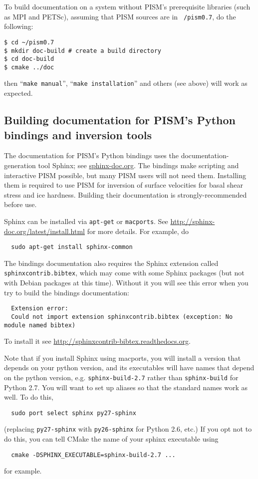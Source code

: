 \documentclass[titlepage,letterpaper,final]{scrartcl}
\begin{document}
To build documentation on a system without PISM's prerequisite
libraries (such as MPI and PETSc), assuming that PISM sources are in \texttt{~/pism0.7}, do the following:
\begin{verbatim}
$ cd ~/pism0.7
$ mkdir doc-build # create a build directory
$ cd doc-build
$ cmake ../doc
\end{verbatim}
then ``\texttt{make manual}'', ``\texttt{make installation}'' and
others (see above) will work as expected.

\subsection{Building documentation for PISM's Python bindings and inversion tools}
The documentation for PISM's Python bindings uses the documentation-generation tool Sphinx; see \href{http://sphinx-doc.org/}{sphinx-doc.org}.  The bindings make scripting and interactive PISM possible, but many PISM users will not need them.  Installing them is required to use PISM for inversion of surface velocities for basal shear stress and ice hardness.  Building their documentation is strongly-recommended before use.

Sphinx can be installed via \texttt{apt-get} or \texttt{macports}.
See \url{http://sphinx-doc.org/latest/install.html} for more details.  For example, do
\begin{verbatim}
  sudo apt-get install sphinx-common
\end{verbatim}

The bindings documentation also requires the Sphinx extension called \texttt{sphinxcontrib.bibtex}, which may come with some Sphinx packages (but not with Debian packages at this time).  Without it you will see this error when you try to build the bindings documentation:
\begin{verbatim}
  Extension error:
  Could not import extension sphinxcontrib.bibtex (exception: No module named bibtex)
\end{verbatim}
To install it see \url{http://sphinxcontrib-bibtex.readthedocs.org}.

Note that if you install Sphinx using macports,
you will install a version that depends on your python
version, and its executables will have names that
depend on the python version, e.g. \texttt{sphinx-build-2.7}
rather than \texttt{sphinx-build} for Python 2.7.  You will want to
set up aliases so that the standard names work as well. To do this,
\begin{verbatim}
  sudo port select sphinx py27-sphinx
\end{verbatim}
(replacing \texttt{py27-sphinx} with \texttt{py26-sphinx} for Python 2.6, etc.)
If you opt not to do this, you can tell CMake the
name of your sphinx executable using
\begin{verbatim}
  cmake -DSPHINX_EXECUTABLE=sphinx-build-2.7 ...
\end{verbatim}
for example.
\end{document}
